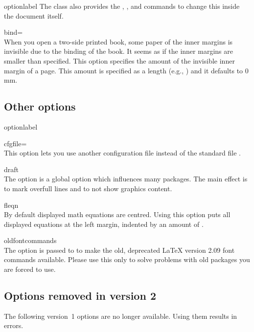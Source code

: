 \begin{labelled}{optionlabel}
  The  class also provides the , ,
  and  commands to change this inside the document itself.

\item[bind=\meta{binding length}]\\
  When you open a two-side printed book, some paper of the inner margins is
  invisible due to the binding of the book. It seems as if the inner
  margins are smaller than specified. This option specifies the amount
   of the invisible inner margin of a page. This amount
  is specified as a length (e.g., \opt{3mm}) and it defaults to
  0\,mm.
\end{labelled}

\subsection{Other options}
\begin{labelled}{optionlabel}
\item[cfgfile=\meta{file}]%
  \\
  This option lets you use another configuration file  instead of the
  standard file . 

\item[draft]\\
  The  option is a global option which influences many packages.
  The main effect is to mark overfull lines and to not show graphics content.

\item[fleqn]\\
  By default displayed math equations are centred. Using this option puts all
  displayed equations at the left margin, indented by an amount of
  .

\item[oldfontcommands]\\
  The  option is passed to  to make the old,
  deprecated LaTeX version 2.09 font commands available. Please use this only
  to solve problems with old packages you are forced to use.
\end{labelled}

\subsection{Options removed in version 2}
The following version~1 options are no longer available. Using them results in
errors.

